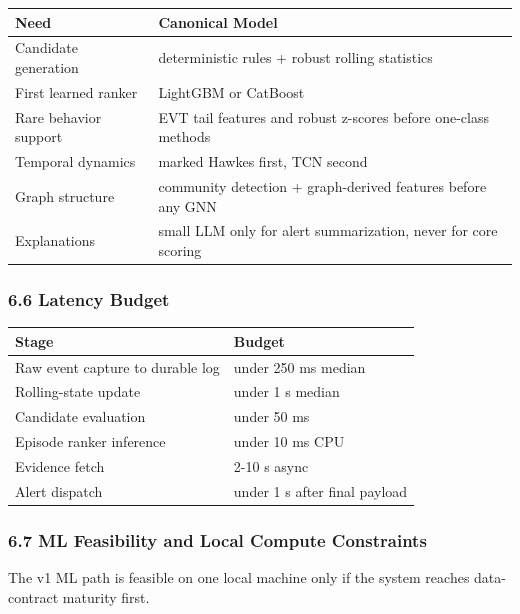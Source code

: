 \documentclass[
]{article}
\newcounter{none} %
\begin{document}
{\def\LTcaptype{none} %
\begin{longtable}[]{@{}ll@{}}
\toprule\noalign{}
Need & Canonical Model \\
\midrule\noalign{}
\endhead
\bottomrule\noalign{}
\endlastfoot
Candidate generation & deterministic rules + robust rolling
statistics \\
First learned ranker & LightGBM or CatBoost \\
Rare behavior support & EVT tail features and robust z-scores before
one-class methods \\
Temporal dynamics & marked Hawkes first, TCN second \\
Graph structure & community detection + graph-derived features before
any GNN \\
Explanations & small LLM only for alert summarization, never for core
scoring \\
\end{longtable}
}

\subsubsection{6.6 Latency Budget}\label{66-latency-budget}

{\def\LTcaptype{none} %
\begin{longtable}[]{@{}ll@{}}
\toprule\noalign{}
Stage & Budget \\
\midrule\noalign{}
\endhead
\bottomrule\noalign{}
\endlastfoot
Raw event capture to durable log & under 250 ms median \\
Rolling-state update & under 1 s median \\
Candidate evaluation & under 50 ms \\
Episode ranker inference & under 10 ms CPU \\
Evidence fetch & 2-10 s async \\
Alert dispatch & under 1 s after final payload \\
\end{longtable}
}

\subsubsection{6.7 ML Feasibility and Local Compute
Constraints}\label{67-ml-feasibility-and-local-compute-constraints}

The v1 ML path is feasible on one local machine only if the system
reaches data-contract maturity first.
\end{document}
